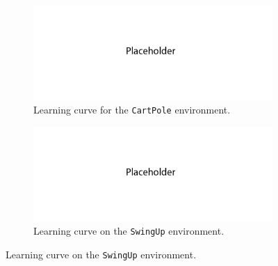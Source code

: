 \documentclass{article}
\begin{document}
\begin{figure}[h!]
\centering
    \begin{subfigure}{0.45\textwidth}
        \centering
        \includegraphics[width=\textwidth]{figures/placeholder_2.png}
          \caption{Learning curve for the \texttt{CartPole} environment.}
    \end{subfigure}
    \hspace{0.2in}
    \begin{subfigure}{0.45\textwidth}
        \centering
        \includegraphics[width=\textwidth]{figures/placeholder_2.png}
          \caption{Learning curve on the \texttt{SwingUp} environment.}
\end{subfigure}
\end{figure}
\end{document}

